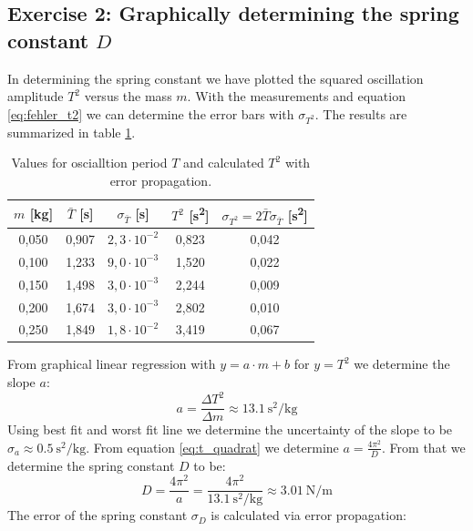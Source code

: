 \subsection{Exercise 2: Graphically determining the spring constant $D$}
In determining the spring constant we have plotted the squared oscillation amplitude $T^2$ versus the mass $m$. With the measurements and equation \eqref{eq:fehler_t2} we can determine the error bars with $\sigma_{T^2}$. The results are summarized in table \ref{tab:t2_auswertung}.
\begin{table}[h]
    \centering
    
    \begin{tabular}{c c c c c}
        \toprule
        $m$ [\unit{\kilogram}] & $\bar{T}$ [\unit{\second}] & $\sigma_{\bar{T}}$ [\unit{\second}] & $T^2$ [\unit{\second \squared}] & $\sigma_{T^2} = 2\bar{T}\sigma_{\bar{T}}$ [\unit{\second \squared}] \\
        \midrule
        0,050 & 0,907 & $2{,}3 \cdot 10^{-2}$ & 0,823 & 0,042 \\
        0,100 & 1,233 & $9{,}0 \cdot 10^{-3}$ & 1,520 & 0,022 \\
        0,150 & 1,498 & $3{,}0 \cdot 10^{-3}$ & 2,244 & 0,009 \\
        0,200 & 1,674 & $3{,}0 \cdot 10^{-3}$ & 2,802 & 0,010 \\
        0,250 & 1,849 & $1{,}8 \cdot 10^{-2}$ & 3,419 & 0,067 \\
        \bottomrule
    \end{tabular}
    \caption{Values for oscialltion period $T$ and calculated $T^2$ with error propagation.}
    \label{tab:t2_auswertung}
\end{table}
From graphical linear regression with $y = a \cdot m + b$ for $y = T^2$ we determine the slope $a$:
\begin{equation}
    a = \frac{\Delta T^2}{\Delta m} \approx \qty{13.1}{\second \squared \per \kilogram}
\end{equation}
Using best fit and worst fit line we determine the uncertainty of the slope to be $\sigma_a \approx \qty{0,5}{\second \squared \per \kilogram}$.
From equation \eqref{eq:t_quadrat} we determine $a = \frac{4\pi^2}{D}$. From that we determine the spring constant $D$ to be:
\begin{equation}
    D = \frac{4\pi^2}{a} = \frac{4\pi^2}{\qty{13.1}{\second \squared \per \kilogram}} \approx \qty{3.01}{\newton \per \meter}
\end{equation}
The error of the spring constant $\sigma_D$ is calculated via error propagation:
